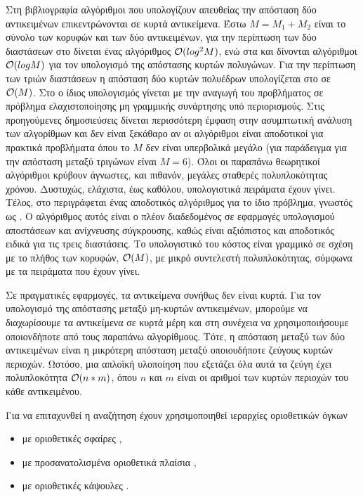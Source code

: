 Στη βιβλιογραφία αλγόριθμοι που υπολογίζουν απευθείας την απόσταση δύο αντικειμένων 
επικεντρώνονται σε κυρτά αντικείμενα.
Έστω $M = M_1 + M_2$ είναι το σύνολο των κορυφών και των δύο 
αντικειμένων,
για την περίπτωση των δύο διαστάσεων στο 
\cite{schwartz1981finding} δίνεται ένας αλγόριθμος $\mathcal{O}(log^2M)$, 
ενώ στα \cite{edelsbrunner1985computing} 
και \cite{chin1983optimal} δίνονται αλγόριθμοι $\mathcal{O}(logM)$ 
για τον υπολογισμό της απόστασης κυρτών πολυγώνων.
Για την περίπτωση των τριών διαστάσεων η απόσταση δύο κυρτών πολυέδρων 
υπολογίζεται στο \cite{dobkin1985linear} σε $\mathcal{O}(M)$.
Στο \cite{bobrow1989direct} ο ίδιος υπολογισμός γίνεται με την
αναγωγή του προβλήματος σε πρόβλημα ελαχιστοποίησης 
μη γραμμικής συνάρτησης υπό περιορισμούς.
Στις προηγούμενες δημοσιεύσεις δίνεται περισσότερη έμφαση 
στην ασυμπτωτική ανάλυση των αλγορίθμων και δεν είναι ξεκάθαρο 
αν οι αλγόριθμοι είναι αποδοτικοί για πρακτικά προβλήματα όπου το 
$M$ δεν είναι υπερβολικά μεγάλο (για παράδειγμα για την απόσταση 
μεταξύ τριγώνων είναι $M = 6$).
Όλοι οι παραπάνω θεωρητικοί αλγόριθμοι κρύβουν άγνωστες, και πιθανόν, 
μεγάλες σταθερές πολυπλοκότητας χρόνου. 
Δυστυχώς, ελάχιστα, έως καθόλου, υπολογιστικά πειράματα έχουν γίνει.
Τέλος, στο \cite{gilbert1988fast} περιγράφεται ένας αποδοτικός αλγόριθμος 
για το ίδιο πρόβλημα, γνωστός ως .
Ο αλγόριθμος αυτός είναι ο πλέον διαδεδομένος σε εφαρμογές 
υπολογισμού αποστάσεων και ανίχνευσης σύγκρουσης, καθώς είναι αξιόπιστος 
και αποδοτικός ειδικά για τις τρεις διαστάσεις.
Το υπολογιστικό του κόστος είναι γραμμικό σε σχέση με το πλήθος των κορυφών,
$\mathcal{O}(M)$, με μικρό συντελεστή πολυπλοκότητας, σύμφωνα με τα πειράματα που 
έχουν γίνει. 

Σε πραγματικές εφαρμογές, τα αντικείμενα συνήθως δεν είναι κυρτά.
Για τον υπολογισμό της απόστασης μεταξύ μη-κυρτών αντικειμένων, 
μπορούμε να διαχωρίσουμε τα αντικείμενα σε κυρτά μέρη και 
στη συνέχεια να χρησιμοποιήσουμε οποιονδήποτε από τους παραπάνω
αλγορίθμους.
Τότε, η απόσταση μεταξύ των δύο αντικειμένων είναι η μικρότερη απόσταση 
μεταξύ οποιουδήποτε ζεύγους κυρτών περιοχών. 
Ωστόσο, μια απλοϊκή υλοποίηση που εξετάζει όλα αυτά τα ζεύγη έχει 
πολυπλοκότητα $\mathcal{O}(n*m)$, όπου $n$ και $m$ είναι οι αριθμοί των 
κυρτών περιοχών του κάθε αντικειμένου.

Για να επιταχυνθεί η αναζήτηση έχουν χρησιμοποιηθεί ιεραρχίες οριοθετικών όγκων
\begin{itemize}
    \item με οριοθετικές σφαίρες \cite{quinlan1994efficient},
    \item με προσανατολισμένα οριοθετικά πλαίσια \cite{johnson1998framework},
    \item με οριοθετικές κάψουλες \cite{larsen1999fast}.
\end{itemize}

